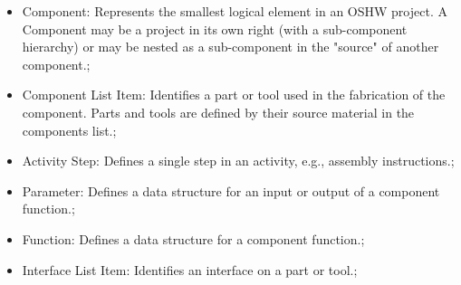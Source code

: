 \documentclass[journal,article,submit,pdftex,moreauthors]{Definitions/mdpi}
\begin{document}
\begin{itemize}
	\item	Component: Represents the smallest logical element in an OSHW project. A Component may be a project in its own right (with a sub-component hierarchy) or may be nested as a sub-component in the "source" of another component.;
	\item	Component List Item: Identifies a part or tool used in the fabrication of the component. Parts and tools are defined by their source material in the components list.;
	\item	Activity Step: Defines a single step in an activity, e.g., assembly instructions.;
	\item	Parameter: Defines a data structure for an input or output of a component function.;
	\item	Function: Defines a data structure for a component function.;
	\item	Interface List Item: Identifies an interface on a part or tool.;
\end{itemize}
\end{document}

